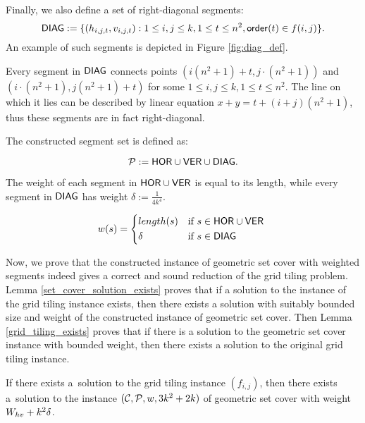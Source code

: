 Finally, we also define a set of right-diagonal segments:
$$\mathsf{DIAG} := \{ (h_{i, j, t}, v_{i, j, t}) :
	1 \le i, j \le k, 1 \le t \le n^2, \mathsf{order}(t) \in f(i, j)\}.$$
An example of such segments is depicted in Figure \ref{fig:diag_def}.



Every segment in $\mathsf{DIAG}$
connects points $(i(n^2+1) + t, j \cdot (n^2+1))$
and ${(i \cdot (n^2+1), j(n^2+1) + t)}$
for some $1 \le i,j \le k, 1 \le t \le n^2$.
The line on which it lies can be described
by linear equation ${x+y=t+(i+j)(n^2+1)}$,
thus these segments are in fact right-diagonal.

The constructed segment set is defined as:

$$\mathcal{P} := \mathsf{HOR} \cup \mathsf{VER} \cup \mathsf{DIAG}.$$

The weight of each segment in $\mathsf{HOR} \cup \mathsf{VER}$
is equal to its length,
while every segment in $\mathsf{DIAG}$ has weight
$\delta := \frac{1}{4k^4}$.



\begin{equation}
w(s) =
	\begin{cases*}
	  length(s) 			& if $s \in \allhor \cup \allver$ \\
	  \delta        & if $s \in \alldiag$
	\end{cases*}
\end{equation}

Now, we prove that the constructed instance of geometric set cover
with weighted segments indeed gives a correct and sound reduction
of the grid tiling problem. Lemma \ref{set_cover_solution_exists}
proves that if a solution to the instance of the grid tiling instance exists,
then there exists a solution with suitably bounded size and weight
of the constructed instance of geometric set cover.
Then Lemma \ref{grid_tiling_exists} proves that if
there is a solution to the geometric set cover instance with bounded weight,
then there exists a solution to the original grid tiling instance.

\begin{lemma}
\label{set_cover_solution_exists}
	If there exists a~solution to the grid tiling instance $(f_{i,j})$,
	then there exists a~solution to the instance $(\mathcal{C}, \mathcal{P}, w, 3k^2+2k)$
	of geometric set cover with weight $W_{hv} +k^2\delta$.
\end{lemma}


